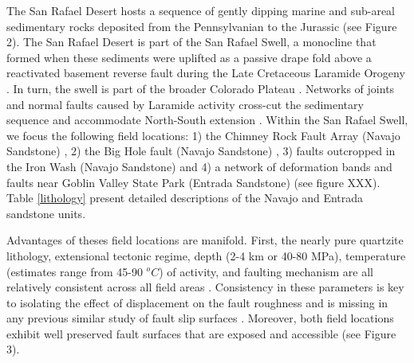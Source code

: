 \documentclass[12pt,a4paper]{article}
\begin{document}
The San Rafael Desert hosts a sequence of gently dipping marine and sub-areal sedimentary rocks deposited from the Pennsylvanian to the Jurassic (see Figure 2). The San Rafael Desert is part of the San Rafael Swell, a monocline that formed when these sediments were uplifted as a passive drape fold above a reactivated basement reverse fault during the Late Cretaceous Laramide Orogeny \cite{kelley1960fracture, vrolijk2005anatomy}. In turn, the swell is part of the broader Colorado Plateau \cite{kelley1960fracture}. Networks of joints and normal faults caused by Laramide activity cross-cut the sedimentary sequence and accommodate North-South extension \cite{kelley1960fracture, aydin1977faulting}. Within the San Rafael Swell, we focus the following field locations: 1) the Chimney Rock Fault Array (Navajo Sandstone) \cite{krantz1986orthorhombic, maerten2001digital, davatzes2003overprinting}, 2) the Big Hole fault (Navajo Sandstone) \cite{shipton2001damage, shipton2003conceptual}, 3) faults outcropped in the Iron Wash (Navajo Sandstone) \cite{aydin1977faulting, aydin1978development} and 4) a network of deformation bands and faults near Goblin Valley State Park \cite{aydin1977faulting, aydin1978development, fossen1998deformation, fossen2005fault} (Entrada Sandstone) (see figure XXX). Table \ref{lithology} present detailed descriptions of the Navajo and Entrada sandstone units.

	Advantages of theses field locations are manifold. First, the nearly pure quartzite lithology, extensional tectonic regime, depth (2-4 km or 40-80 MPa), temperature (estimates range from 45-90 $^oC$) of activity, and faulting mechanism are all relatively consistent across all field areas \cite{vrolijk2005anatomy}. Consistency in these parameters is key to isolating the effect of displacement on the fault roughness and is missing in any previous similar study of fault slip surfaces \cite{sagy2007evolution, brodsky2011faults}. Moreover, both field locations exhibit well preserved fault surfaces that are exposed and accessible (see Figure 3). 
\end{document}
